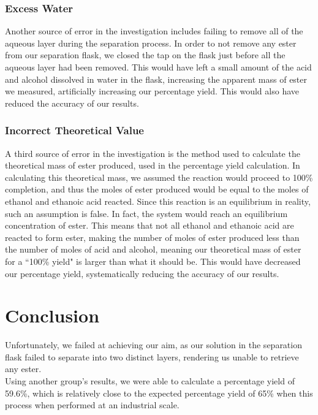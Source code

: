 \documentclass[a4paper,11pt]{article}
\begin{document}
\subsubsection{Excess Water}

Another source of error in the investigation includes failing to remove all of
the aqueous layer during the separation process. In order to not remove any
ester from our separation flask, we closed the tap on the flask just before all
the aqueous layer had been removed. This would have left a small amount of
the acid and alcohol dissolved in water in the flask, increasing the apparent
mass of ester we measured, artificially increasing our percentage yield. This
would also have reduced the accuracy of our results.


\subsubsection{Incorrect Theoretical Value}

A third source of error in the investigation is the method used to calculate the
theoretical mass of ester produced, used in the percentage yield calculation. In
calculating this theoretical mass, we assumed the reaction would proceed to
100\% completion, and thus the moles of ester produced would be equal to the
moles of ethanol and ethanoic acid reacted. Since this reaction is an
equilibrium in reality, such an assumption is false. In fact, the system would
reach an equilibrium concentration of ester. This means that not all ethanol and
ethanoic acid are reacted to form ester, making the number of moles of ester
produced less than the number of moles of acid and alcohol, meaning our
theoretical mass of ester for a ``100\% yield" is larger than what it should be. This would have
decreased our percentage yield, systematically reducing the accuracy of our
results.


\section{Conclusion}

Unfortunately, we failed at achieving our aim, as our solution in the separation
flask failed to separate into two distinct layers, rendering us unable to
retrieve any ester. \\

Using another group's results, we were able to calculate a percentage yield of
59.6\%, which is relatively close to the expected percentage yield of 65\% when
this process when performed at an industrial scale.
\end{document}
